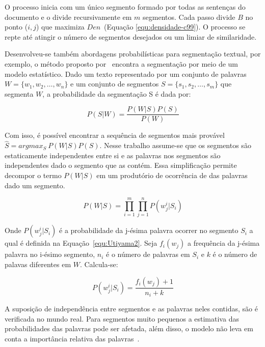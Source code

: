 O processo inicia com um único segmento formado por todas as sentenças do documento e o divide recursivamente em $m$ segmentos. Cada passo divide $B$ no ponto ($i,j$) que maximiza $Den$~(Equação \ref{equ:densidade-c99}). O processo se repte até atingir o número de segmentos desejados ou um limiar de similaridade.







Desenvolveu-se também abordagens probabilísticas para segmentação textual, por exemplo, o método proposto por~\cite{Utiyama2001} encontra a segmentação por meio de um modelo estatístico. Dado um texto representado por um conjunto de palavras 
$W = \{w_1, w_2, \dots, w_n\}$ e um conjunto de segmentos $S = \{s_1, s_2, \dots, s_m\}$ que segmenta $W$, a probabilidade da segmentação S é dada por:

\begin{equation}
	P(S|W) = \frac{P(W|S)P(S)}{P(W)}
\end{equation}

Com isso, é possível encontrar a sequência de segmentos mais provável $\hat{S} = arg max_S~P(W|S) P(S)$. Nesse trabalho assume-se que os segmentos são estaticamente independentes entre si e as palavras nos segmentos são independentes dado o segmento que as contém. Essa simplificação permite decompor o termo $P(W|S)$ em um produtório de ocorrência de das palavras dado um segmento.  

\begin{equation}
	P(W|S) = \prod_{i=1}^m \prod_{j=1}^n P(w_j^i|S_i)
\end{equation}

Onde $P(w_j^i|S_i)$ é a probabilidade da j-ésima palavra ocorrer no segmento $S_i$ a qual é definida na Equação~\ref{equ:Utiyama2}. Seja $f_i(w_j)$ a frequência da j-ésima palavra no i-ésimo segmento, $n_i$ é o número de palavras em $S_i$ e $k$ é o número de palavas diferentes em $W$. Calcula-se: 

\begin{equation}
	P(w_j^i|S_i) = \frac{f_i(w_j) + 1}{n_i + k}
	\label{equ:Utiyama2}
\end{equation}

A suposição de independência entre segmentos e as palavras neles contidas, são é verificada no mundo real. Para segmentos muito pequenos a estimativa das probabilidades das palavras pode ser afetada, além disso, o modelo não leva em conta a importância relativa das palavras~\cite{Malioutov:2006a}.


